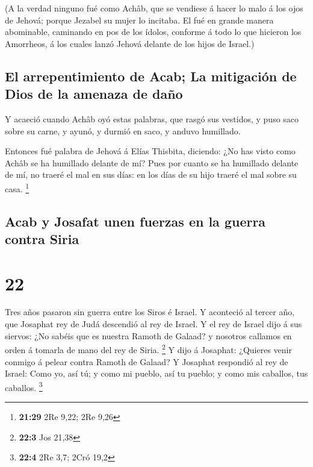  (A la verdad ninguno fué como Achâb, que se vendiese á
hacer lo malo á los ojos de Jehová; porque Jezabel su mujer lo incitaba.
 El fué en grande manera abominable, caminando en pos de
los ídolos, conforme á todo lo que hicieron los Amorrheos, á los cuales
lanzó Jehová delante de los hijos de Israel.)

\hypertarget{el-arrepentimiento-de-acab-la-mitigaciuxf3n-de-dios-de-la-amenaza-de-dauxf1o}{%
\subsection{El arrepentimiento de Acab; La mitigación de Dios de la
amenaza de
daño}\label{el-arrepentimiento-de-acab-la-mitigaciuxf3n-de-dios-de-la-amenaza-de-dauxf1o}}

 Y acaeció cuando Achâb oyó estas palabras, que rasgó sus
vestidos, y puso saco sobre su carne, y ayunó, y durmió en saco, y
anduvo humillado.

 Entonces fué palabra de Jehová á Elías Thisbita, diciendo:
 ¿No has visto como Achâb se ha humillado delante de mí?
Pues por cuanto se ha humillado delante de mí, no traeré el mal en sus
días: en los días de su hijo traeré el mal sobre su casa. \footnote{\textbf{21:29}
  2Re 9,22; 2Re 9,26}

\hypertarget{acab-y-josafat-unen-fuerzas-en-la-guerra-contra-siria}{%
\subsection{Acab y Josafat unen fuerzas en la guerra contra
Siria}\label{acab-y-josafat-unen-fuerzas-en-la-guerra-contra-siria}}

\hypertarget{section-21}{%
\section{22}\label{section-21}}

 Tres años pasaron sin guerra entre los Siros é Israel.
 Y aconteció al tercer año, que Josaphat rey de Judá
descendió al rey de Israel.  Y el rey de Israel dijo á sus
siervos: ¿No sabéis que es nuestra Ramoth de Galaad? y nosotros callamos
en orden á tomarla de mano del rey de Siria. \footnote{\textbf{22:3} Jos
  21,38}  Y dijo á Josaphat: ¿Quieres venir conmigo á pelear
contra Ramoth de Galaad? Y Josaphat respondió al rey de Israel: Como yo,
así tú; y como mi pueblo, así tu pueblo; y como mis caballos, tus
caballos. \footnote{\textbf{22:4} 2Re 3,7; 2Cró 19,2}

